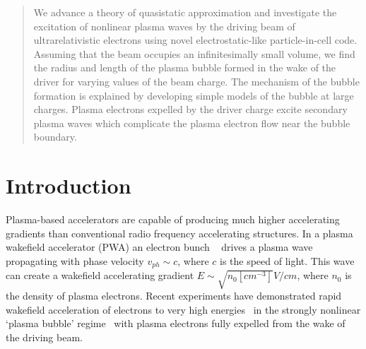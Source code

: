 \documentclass[twocolumn,showpacs,aip]{revtex4}
\begin{document}
\date{\today}
\begin{abstract}
 We advance a theory of quasistatic approximation and investigate the excitation of nonlinear plasma waves by the driving  beam of ultrarelativistic electrons  using novel electrostatic-like particle-in-cell code. Assuming that the beam  occupies  an infinitesimally small volume, we find  the radius and length of the plasma bubble formed  in the wake of  the driver for varying values of the beam charge. The mechanism of the bubble formation is explained by developing  simple models of the bubble at large charges. Plasma electrons expelled by the driver charge excite  secondary plasma waves which complicate the plasma electron flow near the bubble boundary.
	\end{abstract}

\maketitle



\section{Introduction}
%
Plasma-based accelerators are capable of producing much higher accelerating gradients than conventional radio frequency accelerating structures. In a plasma wakefield accelerator (PWA) an  electron bunch ~\cite{Chen_1985,Tajima_1979}
drives  a plasma wave propagating with phase velocity $v_{ph}\sim c$, where $c$ is the speed of light. This wave can create  a wakefield  accelerating gradient $E\sim\sqrt{n_0[cm^{-3}]}V/cm$, where $n_0$ is the density of plasma electrons. Recent experiments  have demonstrated rapid wakefield acceleration of electrons to very high energies~\cite{blumenfeld_energy_2007}
  in the strongly nonlinear  `plasma bubble'  regime~\cite{Rosenzweig_1991} with plasma electrons  fully expelled from the wake of the driving beam. 
\end{document}

